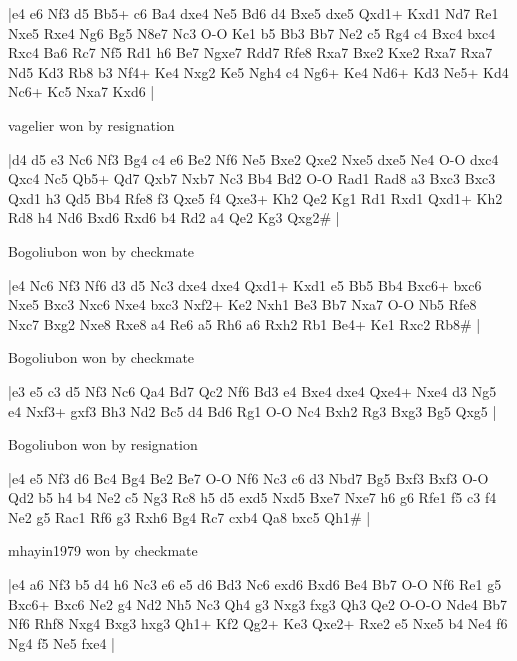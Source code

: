 \makegametitle
|e4 e6 Nf3 d5 Bb5+ c6 Ba4 dxe4 Ne5 Bd6 d4 Bxe5 dxe5 Qxd1+ Kxd1 Nd7 Re1 Nxe5 Rxe4 Ng6 Bg5 N8e7 Nc3 O-O Ke1 b5 Bb3 Bb7 Ne2 c5 Rg4 c4 Bxc4 bxc4 Rxc4 Ba6 Rc7 Nf5 Rd1 h6 Be7 Ngxe7 Rdd7 Rfe8 Rxa7 Bxe2 Kxe2 Rxa7 Rxa7 Nd5 Kd3 Rb8 b3 Nf4+ Ke4 Nxg2 Ke5 Ngh4 c4 Ng6+ Ke4 Nd6+ Kd3 Ne5+ Kd4 Nc6+ Kc5 Nxa7 Kxd6  |

\showboard

vagelier won by resignation

\makegametitle
|d4 d5 e3 Nc6 Nf3 Bg4 c4 e6 Be2 Nf6 Ne5 Bxe2 Qxe2 Nxe5 dxe5 Ne4 O-O dxc4 Qxc4 Nc5 Qb5+ Qd7 Qxb7 Nxb7 Nc3 Bb4 Bd2 O-O Rad1 Rad8 a3 Bxc3 Bxc3 Qxd1 h3 Qd5 Bb4 Rfe8 f3 Qxe5 f4 Qxe3+ Kh2 Qe2 Kg1 Rd1 Rxd1 Qxd1+ Kh2 Rd8 h4 Nd6 Bxd6 Rxd6 b4 Rd2 a4 Qe2 Kg3 Qxg2\#  |

\showboard

Bogoliubon won by checkmate

\makegametitle
|e4 Nc6 Nf3 Nf6 d3 d5 Nc3 dxe4 dxe4 Qxd1+ Kxd1 e5 Bb5 Bb4 Bxc6+ bxc6 Nxe5 Bxc3 Nxc6 Nxe4 bxc3 Nxf2+ Ke2 Nxh1 Be3 Bb7 Nxa7 O-O Nb5 Rfe8 Nxc7 Bxg2 Nxe8 Rxe8 a4 Re6 a5 Rh6 a6 Rxh2 Rb1 Be4+ Ke1 Rxc2 Rb8\#  |

\showboard

Bogoliubon won by checkmate

\makegametitle
|e3 e5 c3 d5 Nf3 Nc6 Qa4 Bd7 Qc2 Nf6 Bd3 e4 Bxe4 dxe4 Qxe4+ Nxe4 d3 Ng5 e4 Nxf3+ gxf3 Bh3 Nd2 Bc5 d4 Bd6 Rg1 O-O Nc4 Bxh2 Rg3 Bxg3 Bg5 Qxg5  |

\showboard

Bogoliubon won by resignation

\makegametitle
|e4 e5 Nf3 d6 Bc4 Bg4 Be2 Be7 O-O Nf6 Nc3 c6 d3 Nbd7 Bg5 Bxf3 Bxf3 O-O Qd2 b5 h4 b4 Ne2 c5 Ng3 Rc8 h5 d5 exd5 Nxd5 Bxe7 Nxe7 h6 g6 Rfe1 f5 c3 f4 Ne2 g5 Rac1 Rf6 g3 Rxh6 Bg4 Rc7 cxb4 Qa8 bxc5 Qh1\#  |

\showboard

mhayin1979 won by checkmate

\makegametitle
|e4 a6 Nf3 b5 d4 h6 Nc3 e6 e5 d6 Bd3 Nc6 exd6 Bxd6 Be4 Bb7 O-O Nf6 Re1 g5 Bxc6+ Bxc6 Ne2 g4 Nd2 Nh5 Nc3 Qh4 g3 Nxg3 fxg3 Qh3 Qe2 O-O-O Nde4 Bb7 Nf6 Rhf8 Nxg4 Bxg3 hxg3 Qh1+ Kf2 Qg2+ Ke3 Qxe2+ Rxe2 e5 Nxe5 b4 Ne4 f6 Ng4 f5 Ne5 fxe4  |

